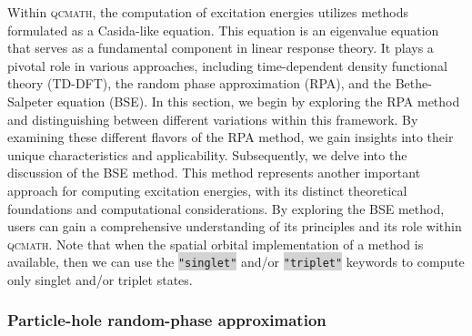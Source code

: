 \documentclass[aip,jcp,reprint,noshowkeys,superscriptaddress]{revtex4-1}
\newcommand{\qcmath}{\textsc{qcmath}\xspace}
\newcommand{\keyword}[1]{{\colorbox{lightgray}{\texttt{#1}}}}
\begin{document}
Within \qcmath, the computation of excitation energies utilizes methods formulated as a Casida-like equation. \cite{Casida_2005} This equation is an eigenvalue equation that serves as a fundamental component in linear response theory. It plays a pivotal role in various approaches, including time-dependent density functional theory (TD-DFT), \cite{UlrichBook} the random phase approximation (RPA), and the Bethe-Salpeter equation (BSE). \cite{MartinBook}
In this section, we begin by exploring the RPA method and distinguishing between different variations within this framework. By examining these different flavors of the RPA method, we gain insights into their unique characteristics and applicability.
Subsequently, we delve into the discussion of the BSE method. This method represents another important approach for computing excitation energies, with its distinct theoretical foundations and computational considerations. By exploring the BSE method, users can gain a comprehensive understanding of its principles and its role within \qcmath. Note that when the spatial orbital implementation of a method is available, then we can use the \keyword{"singlet"} and/or \keyword{"triplet"} keywords to compute only singlet and/or triplet states.

\subsubsection*{Particle-hole random-phase approximation}
\label{subsec:ph-RPA}
\end{document}
